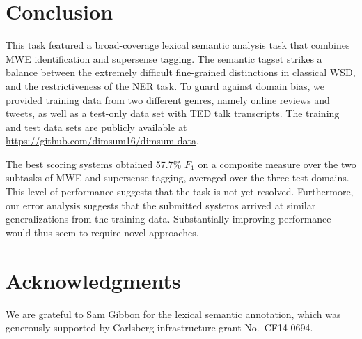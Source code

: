 \documentclass[11pt,letterpaper]{article}
\begin{document}
\section{Conclusion}
This task featured a broad-coverage lexical semantic analysis task that combines MWE identification and supersense tagging. 
The semantic tagset strikes a balance between the extremely difficult fine-grained distinctions in classical WSD, 
and the restrictiveness of the NER task. To guard against domain bias, we provided training data 
from two different genres, namely online reviews and tweets, as well as a test-only data set with TED talk transcripts. 
The training and test data sets are publicly available at \url{https://github.com/dimsum16/dimsum-data}.

The best scoring systems obtained 57.7\% $F_1$ on a composite measure over the two subtasks of MWE and supersense tagging, 
averaged over the three test domains. This level of performance suggests that the task is not yet resolved. 
Furthermore, our error analysis suggests that the submitted systems  
arrived at similar generalizations from the training data. 
Substantially improving performance would thus seem to require novel approaches. 

\section*{Acknowledgments}

We are grateful to Sam Gibbon for the lexical semantic annotation,
which was generously supported by Carlsberg infrastructure grant No.~CF14-0694.





\setlength{\bibsep}{10pt}
{\fontsize{10}{12.25}\selectfont
}
\end{document}
